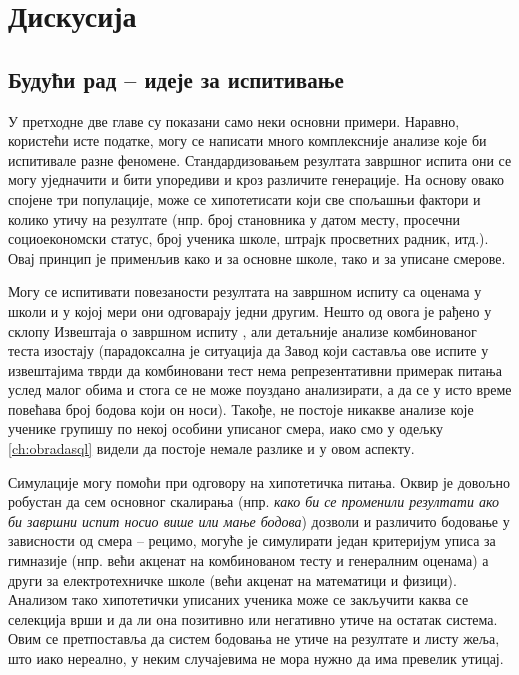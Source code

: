 \chapter{Дискусија}\label{ch:\thechapter}

\section{Будући рад -- идеје за испитивање}

У претходне две главе су показани само неки основни примери. Наравно, користећи исте податке, могу се написати много комплексније анализе које би испитивале разне феномене. Стандардизовањем резултата завршног испита они се могу уједначити и бити упоредиви и кроз различите генерације. На основу овако спојене три популације, може се хипотетисати који све спољашњи фактори и колико утичу на резултате (нпр. број становника у датом месту, просечни социоекономски статус, број ученика школе, штрајк просветних радник, итд.). Овај принцип је применљив како и за основне школе, тако и за уписане смерове.

Могу се испитивати повезаности резултата на завршном испиту са оценама у школи и у којој мери они одговарају једни другим. Нешто од овога је рађено у склопу Извештаја о завршном испиту \citep{izvestaj15}\citep{izvestaj16}\citep{izvestaj17}, али детаљније анализе комбинованог теста изостају (парадоксална је ситуација да Завод који саставља ове испите у извештајима тврди да комбиновани тест нема репрезентативни примерак питања услед малог обима и стога се не може поуздано анализирати, а да се у исто време повећава број бодова који он носи). Такође, не постоје никакве анализе које ученике групишу по некој особини уписаног смера, иако смо у одељку \ref{ch:obradasql} видели да постоје немале разлике и у овом аспекту.

Симулације могу помоћи при одговору на хипотетичка питања. Оквир је довољно робустан да сем основног скалирања (нпр. \emph{како би се променили резултати ако би завршни испит носио више или мање бодова}) дозволи и различито бодовање у зависности од смера -- рецимо, могуће је симулирати један критеријум уписа за гимназије (нпр. већи акценат на комбинованом тесту и генералним оценама) а други за електротехничке школе (већи акценат на математици и физици). Анализом тако хипотетички уписаних ученика може се закључити каква се селекција врши и да ли она позитивно или негативно утиче на остатак система. Овим се претпоставља да систем бодовања не утиче на резултате и листу жеља, што иако нереално, у неким случајевима не мора нужно да има превелик утицај.

